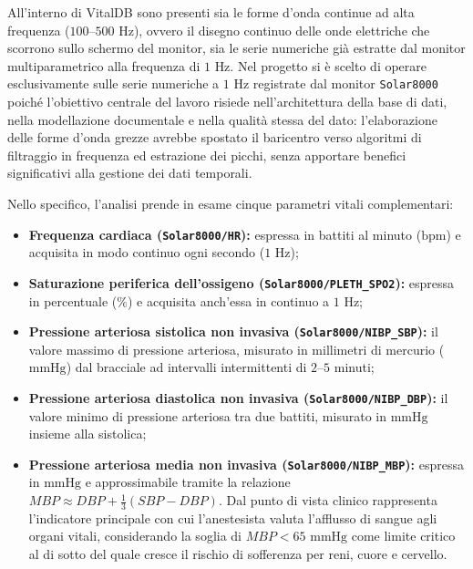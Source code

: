 All'interno di VitalDB sono presenti sia le forme d'onda continue ad alta frequenza ($100\text{--}500\text{ Hz}$), ovvero il disegno continuo delle onde elettriche che scorrono sullo schermo del monitor, sia le serie numeriche gi\`a estratte dal monitor multiparametrico alla frequenza di $1\text{ Hz}$. Nel progetto si \`e scelto di operare esclusivamente sulle serie numeriche a $1\text{ Hz}$ registrate dal monitor \texttt{Solar8000} poich\'e l'obiettivo centrale del lavoro risiede nell'architettura della base di dati, nella modellazione documentale e nella qualit\`a stessa del dato: l'elaborazione delle forme d'onda grezze avrebbe spostato il baricentro verso algoritmi di filtraggio in frequenza ed estrazione dei picchi, senza apportare benefici significativi alla gestione dei dati temporali.

Nello specifico, l'analisi prende in esame cinque parametri vitali complementari:
\begin{itemize}
    \item \textbf{Frequenza cardiaca (\texttt{Solar8000/HR}):} espressa in battiti al minuto ($\text{bpm}$) e acquisita in modo continuo ogni secondo ($1\text{ Hz}$);    \item \textbf{Saturazione periferica dell'ossigeno (\texttt{Solar8000/PLETH\_SPO2}):} espressa in percentuale ($\text{\%}$) e acquisita anch'essa in continuo a $1\text{ Hz}$;    \item \textbf{Pressione arteriosa sistolica non invasiva (\texttt{Solar8000/NIBP\_SBP}):} il valore massimo di pressione arteriosa, misurato in millimetri di mercurio ($\text{mmHg}$) dal bracciale ad intervalli intermittenti di $2\text{--}5$ minuti;    \item \textbf{Pressione arteriosa diastolica non invasiva (\texttt{Solar8000/NIBP\_DBP}):} il valore minimo di pressione arteriosa tra due battiti, misurato in $\text{mmHg}$ insieme alla sistolica;    \item \textbf{Pressione arteriosa media non invasiva (\texttt{Solar8000/NIBP\_MBP}):} espressa in $\text{mmHg}$ e approssimabile tramite la relazione $MBP \approx DBP + \frac{1}{3}(SBP - DBP)$. Dal punto di vista clinico rappresenta l'indicatore principale con cui l'anestesista valuta l'afflusso di sangue agli organi vitali, considerando la soglia di $MBP < 65\text{ mmHg}$ come limite critico al di sotto del quale cresce il rischio di sofferenza per reni, cuore e cervello.\end{itemize}

